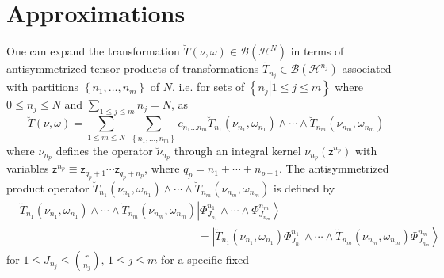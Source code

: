 \documentclass[aps,preprint]{revtex4}%
\begin{document}
\section{Approximations\label{Approx}}

One can expand the transformation $\breve{T}\left(  \nu,\omega\right)
\in\mathcal{B}\left(  \mathcal{H}^{N}\right)  $ in terms of antisymmetrized
tensor products of transformations \cite{Marcus}\cite{Greub} $\breve{T}%
_{n_{j}}\in\mathcal{B}\left(  \mathcal{H}^{n_{j}}\right)  $ associated with
partitions $\left\{  n_{1},\ldots,n_{m}\right\}  $ of $N$, i.e. for sets of
$\left\{  \left.  n_{j}\right\vert 1\leq j\leq m\right\}  $ where $0\leq
n_{j}\leq N$ and $%
{\textstyle\sum\limits_{1\leq j\leq m}}
n_{j}=N$, as
\begin{equation}
\breve{T}\left(  \nu,\omega\right)  =%
{\displaystyle\sum\limits_{1\leq m\leq N}}
\,%
{\displaystyle\sum\limits_{\left\{  n_{1},\ldots,n_{m}\right\}  }}
c_{n_{1}\ldots n_{m}}\breve{T}_{n_{1}}\left(  \nu_{n_{1}},\omega_{n_{1}%
}\right)  \wedge\cdots\wedge\breve{T}_{n_{m}}\left(  \nu_{n_{m}},\omega
_{n_{m}}\right)  \label{Transexp}%
\end{equation}
where $\nu_{n_{p}}$ defines the operator $\breve{\nu}_{n_{p}}$ through an
integral kernel $\nu_{n_{p}}\left(  \mathsf{z}^{n_{p}}\right)  $ with
variables $\mathsf{z}^{n_{p}}\equiv\mathsf{z}_{q_{p}+1}\cdots\mathsf{z}%
_{q_{p}+n_{p}}$, where $q_{p}=n_{1}+\cdots+n_{p-1}$. The antisymmetrized
product operator $\breve{T}_{n_{1}}\left(  \nu_{n_{1}},\omega_{n_{1}}\right)
\wedge\cdots\wedge\breve{T}_{n_{m}}\left(  \nu_{n_{m}},\omega_{n_{m}}\right)
$ is defined by
\begin{align}
&  \breve{T}_{n_{1}}\left(  \nu_{n_{1}},\omega_{n_{1}}\right)  \wedge
\cdots\wedge\breve{T}_{n_{m}}\left(  \nu_{n_{m}},\omega_{n_{m}}\right)
\left\vert \Phi_{J_{n_{1}}}^{n_{1}}\wedge\cdots\wedge\Phi_{J_{n_{m}}}^{n_{m}%
}\right\rangle \nonumber\\
&  \qquad\qquad\qquad\qquad\qquad\qquad\qquad\qquad=\left\vert \breve
{T}_{n_{1}}\left(  \nu_{n_{1}},\omega_{n_{1}}\right)  \Phi_{J_{n_{1}}}^{n_{1}%
}\wedge\cdots\wedge\breve{T}_{n_{m}}\left(  \nu_{n_{m}},\omega_{n_{m}}\right)
\Phi_{J_{n_{m}}}^{n_{m}}\right\rangle
\end{align}
for $1\leq J_{n_{j}}\leq\binom{r}{n_{j}},\,1\leq j\leq m$ for a specific fixed
\end{document}
